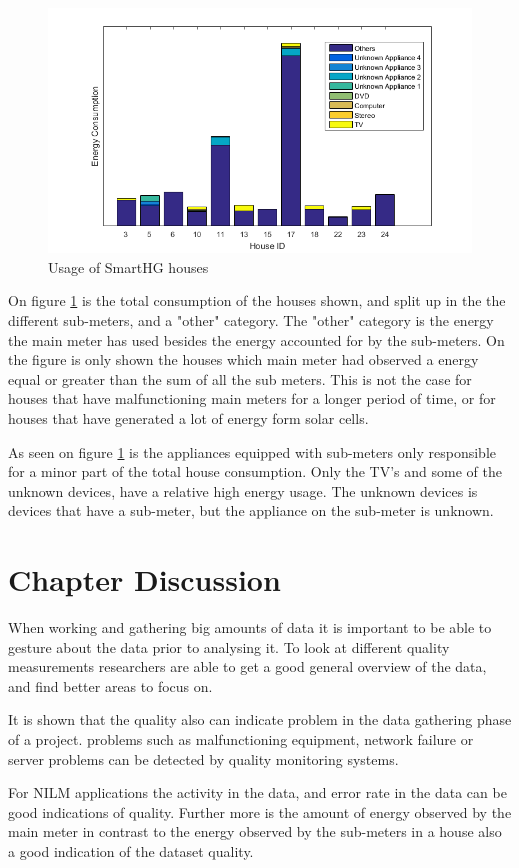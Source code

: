 \begin{figure}[H]
\centering
\includegraphics[width=1\textwidth]{billeder/SHGHouseUsages.png}
\caption{Usage of SmartHG houses}
\label{fig:USAGEofSHG}
\end{figure}

On figure \ref{fig:USAGEofSHG} is the total consumption of the houses shown, and split up in the the different sub-meters, and a "other" category. The "other" category is the energy the main meter has used besides the energy accounted for by the sub-meters. On the figure is only shown the houses which main meter had observed a energy equal or greater than the sum of all the sub meters. This is not the case for houses that have malfunctioning main meters for a longer period of time, or for houses that have generated a lot of energy form solar cells. 

As seen on figure \ref{fig:USAGEofSHG} is the appliances equipped with sub-meters only responsible for a minor part of the total house consumption. Only the TV's and some of the unknown devices, have a relative high energy usage. The unknown devices is devices that have a sub-meter, but the appliance on the sub-meter is unknown.  

\section{Chapter Discussion}
When working and gathering big amounts of data it is important to be able to gesture about the data prior to analysing it. To look at different quality measurements researchers are able to get a good general overview of the data, and find better areas to focus on. 

It is shown that the quality also can indicate problem in the data gathering phase of a project. problems such as malfunctioning equipment, network failure or server problems can be detected by quality monitoring systems. 

For NILM applications the activity in the data, and error rate in the data can be good indications of quality. Further more is the amount of energy observed by the main meter in contrast to the energy observed by the sub-meters in a house also a good indication of the dataset quality. 
